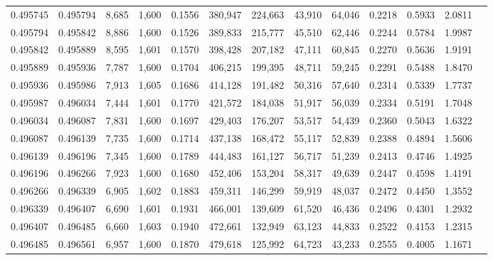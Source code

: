 \begin{tabular}{rrrrrrrrrrrrr}
0.495745 & 0.495794 &  8,685 & 1,600 &                                     0.1556 & 380,947 & 224,663 &  43,910 &  64,046 & 0.2218 & 0.5933 & 2.0811 \\
0.495794 & 0.495842 &  8,886 & 1,600 &                                     0.1526 & 389,833 & 215,777 &  45,510 &  62,446 & 0.2244 & 0.5784 & 1.9987 \\
0.495842 & 0.495889 &  8,595 & 1,601 &                                     0.1570 & 398,428 & 207,182 &  47,111 &  60,845 & 0.2270 & 0.5636 & 1.9191 \\
0.495889 & 0.495936 &  7,787 & 1,600 &                                     0.1704 & 406,215 & 199,395 &  48,711 &  59,245 & 0.2291 & 0.5488 & 1.8470 \\
0.495936 & 0.495986 &  7,913 & 1,605 &                                     0.1686 & 414,128 & 191,482 &  50,316 &  57,640 & 0.2314 & 0.5339 & 1.7737 \\
0.495987 & 0.496034 &  7,444 & 1,601 &                                     0.1770 & 421,572 & 184,038 &  51,917 &  56,039 & 0.2334 & 0.5191 & 1.7048 \\
0.496034 & 0.496087 &  7,831 & 1,600 &                                     0.1697 & 429,403 & 176,207 &  53,517 &  54,439 & 0.2360 & 0.5043 & 1.6322 \\
0.496087 & 0.496139 &  7,735 & 1,600 &                                     0.1714 & 437,138 & 168,472 &  55,117 &  52,839 & 0.2388 & 0.4894 & 1.5606 \\
0.496139 & 0.496196 &  7,345 & 1,600 &                                     0.1789 & 444,483 & 161,127 &  56,717 &  51,239 & 0.2413 & 0.4746 & 1.4925 \\
0.496196 & 0.496266 &  7,923 & 1,600 &                                     0.1680 & 452,406 & 153,204 &  58,317 &  49,639 & 0.2447 & 0.4598 & 1.4191 \\
0.496266 & 0.496339 &  6,905 & 1,602 &                                     0.1883 & 459,311 & 146,299 &  59,919 &  48,037 & 0.2472 & 0.4450 & 1.3552 \\
0.496339 & 0.496407 &  6,690 & 1,601 &                                     0.1931 & 466,001 & 139,609 &  61,520 &  46,436 & 0.2496 & 0.4301 & 1.2932 \\
0.496407 & 0.496485 &  6,660 & 1,603 &                                     0.1940 & 472,661 & 132,949 &  63,123 &  44,833 & 0.2522 & 0.4153 & 1.2315 \\
0.496485 & 0.496561 &  6,957 & 1,600 &                                     0.1870 & 479,618 & 125,992 &  64,723 &  43,233 & 0.2555 & 0.4005 & 1.1671 \\

\end{tabular}
